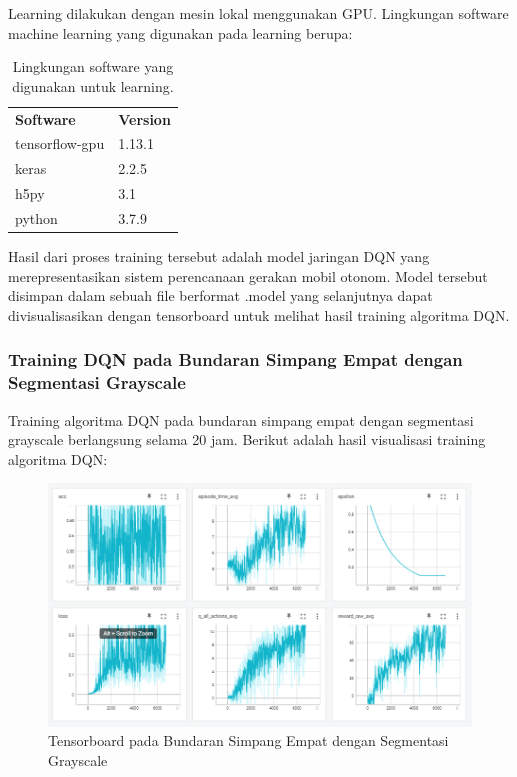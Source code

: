 \documentclass[conference]{IEEEtran}
\begin{document}
	Learning dilakukan dengan mesin lokal menggunakan GPU. Lingkungan software machine learning yang digunakan pada learning berupa:
	
	\begin{table}[H]
		\begin{tabular}{ll}
			\textbf{Software}  & \textbf{Version}              \\
			tensorflow-gpu  & 1.13.1	\\
			keras  & 2.2.5					\\
			h5py & 3.1              \\
			python & 3.7.9              \\
		\end{tabular}
		\caption{Lingkungan software yang digunakan untuk learning.}
		\label{tb:softwaresetup}
	\end{table}
	
	
	Hasil dari proses training tersebut adalah model jaringan DQN yang merepresentasikan sistem perencanaan gerakan mobil otonom. Model tersebut disimpan dalam sebuah file berformat .model yang
	selanjutnya dapat divisualisasikan dengan tensorboard untuk melihat hasil training algoritma DQN. 
	
	\subsubsection{Training DQN pada Bundaran Simpang Empat dengan Segmentasi Grayscale}
	\label{sec:training_dqn_bundaran_simpangempat_segmentasi_grayscale}
	
	Training algoritma DQN pada bundaran simpang empat dengan segmentasi grayscale berlangsung selama 20 jam. Berikut adalah hasil visualisasi training algoritma DQN:
	
	\begin{figure}[H] 
		\centering
		\includegraphics[width=1\linewidth]{images/tensorboard_bundaran_simpangempat_segmentasi_grayscale}
		\caption{Tensorboard pada Bundaran Simpang Empat dengan Segmentasi Grayscale}
		\label{fig:tensorboard_bundaran_simpangempat_segmentasi_grayscale}
	\end{figure}
	
\end{document}
